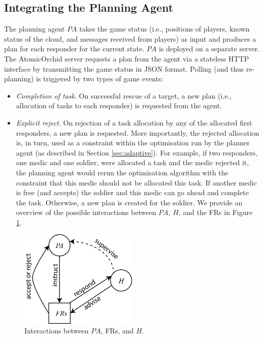 
\subsection{Integrating the Planning Agent}
\noindent The planning agent $PA$ takes the game status (i.e., positions of players, known status of the cloud, and messages received from players) as input and produces a plan for each responder  for the current state. $PA$ is deployed on a separate server. The AtomicOrchid server requests a plan from the agent via a stateless HTTP interface by transmitting the game status in JSON format. Polling (and thus re-planning) is triggered by two types of game events:
\begin{itemize}
\item \textit{Completion of task}. On successful rescue of a target, a new plan (i.e., allocation of tasks to each responder) is requested from the agent.
\item \textit{Explicit reject}. On rejection of a task allocation by any of the allocated first responders, a new plan is requested.  More importantly, the rejected allocation is, in turn, used as a constraint within the optimisation run by the planner agent (as described in Section \ref{sec:adaptive}). For example, if two responders, one medic and one soldier, were allocated a task and the medic rejected it, the planning agent would rerun the optimisation algorithm with the constraint that this medic should not be allocated this task. If another medic is free (and accepts) the soldier and this medic can go ahead and complete the task. Otherwise, a new plan is created for the soldier. We provide an overview of the possible interactions between $PA$, $H$, and the FRs in Figure \ref{fig:arch}.
\end{itemize} 
\begin{figure}\centering
\includegraphics[width=0.5\textwidth]{agent-planner.png}
\caption{Interactions between $PA$, FRs, and $H$.}
\label{fig:arch}
\end{figure}

